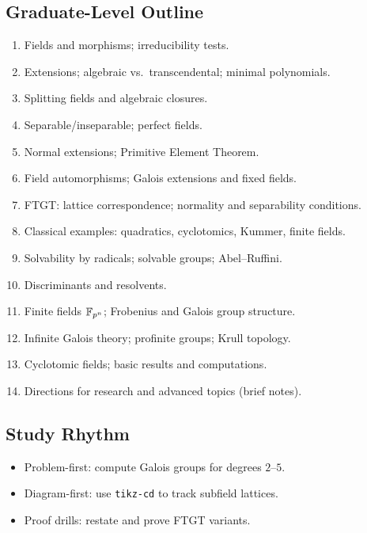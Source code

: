 \subsection*{Graduate-Level Outline}
\begin{enumerate}
  \item Fields and morphisms; irreducibility tests.
  \item Extensions; algebraic vs.\ transcendental; minimal polynomials.
  \item Splitting fields and algebraic closures.
  \item Separable/inseparable; perfect fields.
  \item Normal extensions; Primitive Element Theorem.
  \item Field automorphisms; Galois extensions and fixed fields.
  \item FTGT: lattice correspondence; normality and separability conditions.
  \item Classical examples: quadratics, cyclotomics, Kummer, finite fields.
  \item Solvability by radicals; solvable groups; Abel--Ruffini.
  \item Discriminants and resolvents.
  \item Finite fields $\mathbb{F}_{p^n}$; Frobenius and Galois group structure.
  \item Infinite Galois theory; profinite groups; Krull topology.
  \item Cyclotomic fields; basic results and computations.
  \item Directions for research and advanced topics (brief notes).
\end{enumerate}

\subsection*{Study Rhythm}
\begin{itemize}
  \item Problem-first: compute Galois groups for degrees $2$--$5$.
  \item Diagram-first: use \texttt{tikz-cd} to track subfield lattices.
  \item Proof drills: restate and prove FTGT variants.
\end{itemize}

